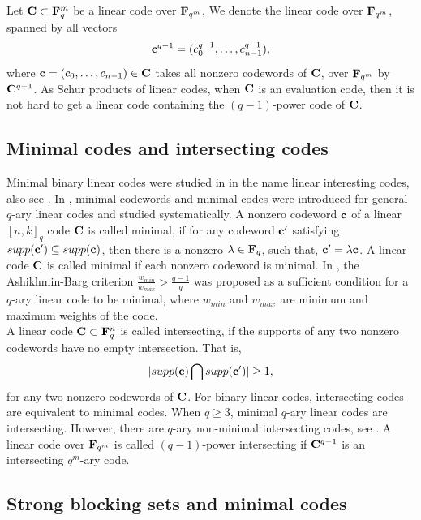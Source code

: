 \documentclass[12pt]{article}
\begin{document}
Let ${\bf C} \subset {\bf F}_q^m$ be a linear code over ${\bf F}_{q^m}$, We denote the linear code over ${\bf F}_{q^m}$, spanned by all vectors $${\bf c}^{q-1}=(c_0^{q-1}, \ldots, c_{n-1}^{q-1}),$$ where ${\bf c}=(c_0,\ldots, c_{n-1})\in {\bf C}$ takes all nonzero codewords of ${\bf C}$, over ${\bf F}_{q^m}$ by ${\bf C}^{q-1}$. As Schur products of linear codes, when ${\bf C}$ is an evaluation code, then it is not hard to get a linear code containing the $(q-1)$-power code of ${\bf C}$.\\



\subsection{Minimal codes and intersecting codes}


Minimal binary linear codes were studied in \cite{CL} in the name linear interesting codes, also see \cite{Borello}. In \cite{AB}, minimal codewords and minimal codes were introduced for general $q$-ary linear codes and studied systematically.  A nonzero codeword ${\bf c}$ of a linear $[n,k]_q$ code ${\bf C}$ is called minimal, if for any codeword ${\bf c}'$ satisfying $supp({\bf c}') \subseteq supp({\bf c})$, then there is a nonzero $\lambda \in {\bf F}_q$, such that, ${\bf c}'=\lambda {\bf c}$. A linear code ${\bf C}$ is called minimal if each nonzero codeword is minimal. In \cite{AB}, the Ashikhmin-Barg criterion $\frac{w_{min}}{w_{max}} > \frac{q-1}{q}$ was proposed as a sufficient condition for a $q$-ary linear code to be minimal, where $w_{min}$ and $w_{max}$ are minimum and maximum weights of the code. \\


A linear code ${\bf C} \subset {\bf F}_q^n$ is called intersecting, if the supports of any two nonzero codewords have no empty intersection. That is, $$|supp({\bf c}) \bigcap supp({\bf c}')|\geq 1,$$ for any two nonzero codewords of ${\bf C}$. For binary linear codes, intersecting codes are equivalent to minimal codes. When $q \geq 3$, minimal $q$-ary linear codes are intersecting. However, there are $q$-ary non-minimal intersecting codes, see \cite{CL,CZ,Borello}. A linear code over ${\bf F}_{q^m}$ is called $(q-1)$-power intersecting if ${\bf C}^{q-1}$ is an intersecting $q^m$-ary code.\\







\subsection{Strong blocking sets and minimal codes}
\end{document}
